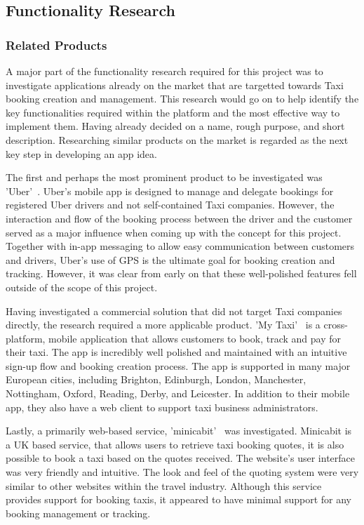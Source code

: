 \subsection{Functionality Research}
\subsubsection{Related Products}
A major part of the functionality research required for this project was to investigate applications already on the market that are targetted towards Taxi booking creation and management. This research would go on to help identify the key functionalities required within the platform and the most effective way to implement them. Having already decided on a name, rough purpose, and short description. Researching similar products on the market is regarded as the next key step in developing an app idea.

The first and perhaps the most prominent product to be investigated was 'Uber'~\cite{uber_documentation_ref}. Uber's mobile app is designed to manage and delegate bookings for registered Uber drivers and not self-contained Taxi companies. However, the interaction and flow of the booking process between the driver and the customer served as a major influence when coming up with the concept for this project. Together with in-app messaging to allow easy communication between customers and drivers, Uber's use of GPS  is the ultimate goal for booking creation and tracking. However, it was clear from early on that these well-polished features fell outside of the scope of this project.

Having investigated a commercial solution that did not target Taxi companies directly, the research required a more applicable product. 'My Taxi'~\cite{mytaxi_documentation_ref} is a cross-platform, mobile application that allows customers to book, track and pay for their taxi. The app is incredibly well polished and maintained with an intuitive sign-up flow and booking creation process. The app is supported in many major European cities, including Brighton, Edinburgh, London, Manchester, Nottingham, Oxford, Reading, Derby, and Leicester. In addition to their mobile app, they also have a web client to support taxi business administrators.

Lastly, a primarily web-based service, 'minicabit'~\cite{minicabit_documentation_ref} was investigated. Minicabit is a UK based service, that allows users to retrieve taxi booking quotes, it is also possible to book a taxi based on the quotes received. The website's user interface was very friendly and intuitive. The look and feel of the quoting system were very similar to other websites within the travel industry. Although this service provides support for booking taxis, it appeared to have minimal support for any booking management or tracking.


